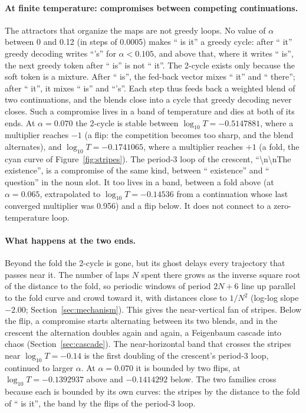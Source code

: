 \documentclass[11pt,letterpaper]{article}
\begin{document}
\paragraph{At finite temperature: compromises between competing continuations.} The attractors that organize the maps
are not greedy loops. No value of $\alpha$ between 0 and 0.12 (in steps of 0.0005) makes `` is it'' a greedy cycle: after
`` it'' greedy decoding writes ``'s'' for $\alpha<0.105$, and above that, where it writes `` is'', the next greedy
token after `` is'' is not `` it''. The 2-cycle exists only because the soft token is a mixture. After `` is'', the fed-back
vector mixes `` it'' and `` there''; after `` it'', it mixes `` is'' and ``'s''. Each step thus feeds back a weighted
blend of two continuations, and the blends close into a cycle that greedy decoding never closes. Such a compromise
lives in a band of temperature and dies at both of its ends. At $\alpha=0.070$ the 2-cycle is stable between
$\log_{10}T=-0.5147881$, where a multiplier reaches $-1$ (a flip: the competition becomes too sharp, and the blend
alternates), and $\log_{10}T=-0.1741065$, where a multiplier reaches $+1$ (a fold, the cyan curve of
Figure~\ref{fig:stripes}). The period-3 loop of the crescent, ``\textbackslash n\textbackslash nThe existence'', is a
compromise of the same kind, between `` existence'' and `` question'' in the noun slot. It too lives in a band, between
a fold above (at $\alpha=0.065$, extrapolated to $\log_{10}T=-0.14536$ from a continuation whose last converged
multiplier was 0.956) and a flip below. It does not connect to a zero-temperature
loop.

\paragraph{What happens at the two ends.} Beyond the fold the 2-cycle is gone, but its ghost delays every trajectory
that passes near it. The number of laps $N$ spent there grows as the inverse square root of the distance to the fold,
so periodic windows of period $2N+6$ line up parallel to the fold curve and crowd toward it, with distances close to
$1/N^2$ (log-log slope $-2.00$; Section~\ref{sec:mechanism}). This gives the near-vertical fan of stripes. Below the flip, a compromise starts
alternating between its two blends, and in the crescent the alternation doubles again and again, a Feigenbaum cascade
into chaos (Section~\ref{sec:cascade}). The near-horizontal band that crosses the stripes near $\log_{10}T=-0.14$ is
the first doubling of the crescent's period-3 loop, continued to larger $\alpha$. At $\alpha=0.070$ it is bounded by
two flips, at $\log_{10}T=-0.1392937$ above and $-0.1414292$ below. The two families cross because each is bounded by
its own curves: the stripes by the distance to the fold of `` is it'', the band by the flips of the period-3 loop.
\end{document}
